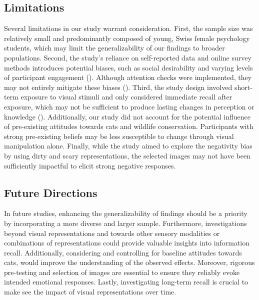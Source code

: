 \documentclass[
  man,
  longtable,
  nolmodern,
  notxfonts,
  notimes,
  colorlinks=true,linkcolor=blue,citecolor=blue,urlcolor=blue]{apa7}
\begin{document}
\subsection{Limitations}\label{limitations}

Several limitations in our study warrant consideration. First, the
sample size was relatively small and predominantly composed of young,
Swiss female psychology students, which may limit the generalizability
of our findings to broader populations. Second, the study's reliance on
self-reported data and online survey methods introduces potential
biases, such as social desirability and varying levels of participant
engagement (). Although
attention checks were implemented, they may not entirely mitigate these
biases (). Third, the
study design involved short-term exposure to visual stimuli and only
considered immediate recall after exposure, which may not be sufficient
to produce lasting changes in perception or knowledge
(). Additionally, our
study did not account for the potential influence of pre-existing
attitudes towards cats and wildlife conservation. Participants with
strong pre-existing beliefs may be less susceptible to change through
visual manipulation alone. Finally, while the study aimed to explore the
negativity bias by using dirty and scary representations, the selected
images may not have been sufficiently impactful to elicit strong
negative responses.

\subsection{Future Directions}\label{future-directions}

In future studies, enhancing the generalizability of findings should be
a priority by incorporating a more diverse and larger sample.
Furthermore, investigations beyond visual representations and towards
other sensory modalities or combinations of representations could
provide valuable insights into information recall. Additionally,
considering and controlling for baseline attitudes towards cats, would
improve the understanding of the observed effects. Moreover, rigorous
pre-testing and selection of images are essential to ensure they
reliably evoke intended emotional responses. Lastly, investigating
long-term recall is crucial to make see the impact of visual
representations over time.
\end{document}
